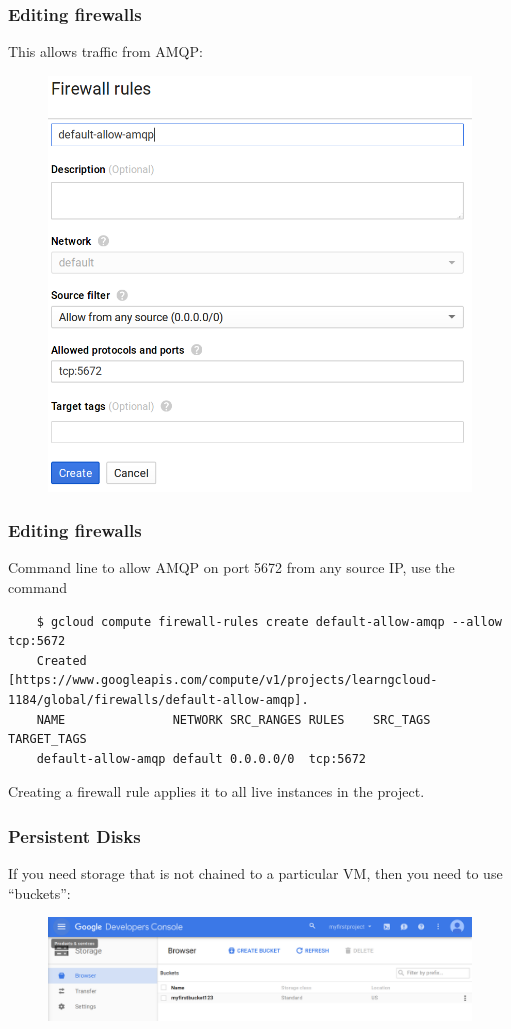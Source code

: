 \documentclass[9pt]{beamer}
\begin{document}
\begin{frame}[fragile]
  \frametitle{Editing firewalls}
  This allows traffic from AMQP:
  \begin{figure}
    \includegraphics[scale=0.2]{figures/DefineFirewall.png}
  \end{figure}
\end{frame}

\begin{frame}[fragile]
  \frametitle{Editing firewalls}
  Command line to allow AMQP on port 5672 from any source IP, use the command
  \begin{verbatim}
    $ gcloud compute firewall-rules create default-allow-amqp --allow tcp:5672
    Created [https://www.googleapis.com/compute/v1/projects/learngcloud-1184/global/firewalls/default-allow-amqp].
    NAME               NETWORK SRC_RANGES RULES    SRC_TAGS TARGET_TAGS
    default-allow-amqp default 0.0.0.0/0  tcp:5672
  \end{verbatim}
  Creating a firewall rule applies it to all live instances in the project.
\end{frame}

\begin{frame}[fragile]
  \frametitle{Persistent Disks}
  If you need storage that is not chained to a particular VM, then you need to use ``buckets'':
  \begin{figure}
    \includegraphics[scale=0.2]{figures/Buckets.png}
  \end{figure}
\end{frame}
\end{document}
